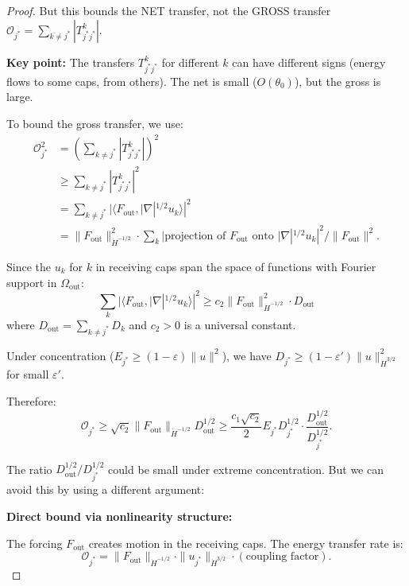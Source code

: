 \documentclass[11pt]{article}
\theoremstyle{definition}
\begin{document}
\begin{proof}
But this bounds the NET transfer, not the GROSS transfer $\mathcal{O}_{j^*} = \sum_{k \neq j^*} |T_{j^*j^*}^k|$.

\textbf{Key point:} The transfers $T_{j^*j^*}^k$ for different $k$ can have different signs (energy flows to some caps, from others). The net is small ($O(\theta_0)$), but the gross is large.

To bound the gross transfer, we use:
\begin{align}
\mathcal{O}_{j^*}^2 &= \left(\sum_{k \neq j^*} |T_{j^*j^*}^k|\right)^2 \\
&\geq \sum_{k \neq j^*} |T_{j^*j^*}^k|^2 \\
&= \sum_{k \neq j^*} |\langle F_{\text{out}}, |\nabla|^{1/2} u_k \rangle|^2 \\
&= \|F_{\text{out}}\|_{\dot{H}^{-1/2}}^2 \cdot \sum_k |\text{projection of } F_{\text{out}} \text{ onto } |\nabla|^{1/2} u_k|^2 / \|F_{\text{out}}\|^2.
\end{align}

Since the $u_k$ for $k$ in receiving caps span the space of functions with Fourier support in $\Omega_{\text{out}}$:
\begin{equation}
\sum_k |\langle F_{\text{out}}, |\nabla|^{1/2} u_k \rangle|^2 \geq c_2 \|F_{\text{out}}\|_{\dot{H}^{-1/2}}^2 \cdot D_{\text{out}}
\end{equation}
where $D_{\text{out}} = \sum_{k \neq j^*} D_k$ and $c_2 > 0$ is a universal constant.

Under concentration ($E_{j^*} \geq (1-\varepsilon)\|u\|^2$), we have $D_{j^*} \geq (1-\varepsilon')\|u\|_{\dot{H}^{3/2}}^2$ for small $\varepsilon'$.

Therefore:
\begin{equation}
\mathcal{O}_{j^*} \geq \sqrt{c_2} \|F_{\text{out}}\|_{\dot{H}^{-1/2}} D_{\text{out}}^{1/2} \geq \frac{c_1\sqrt{c_2}}{2} E_{j^*} D_{j^*}^{1/2} \cdot \frac{D_{\text{out}}^{1/2}}{D_{j^*}^{1/2}}.
\end{equation}

The ratio $D_{\text{out}}^{1/2}/D_{j^*}^{1/2}$ could be small under extreme concentration. But we can avoid this by using a different argument:

\textbf{Direct bound via nonlinearity structure:}

The forcing $F_{\text{out}}$ creates motion in the receiving caps. The energy transfer rate is:
\begin{equation}
\mathcal{O}_{j^*} = \|F_{\text{out}}\|_{\dot{H}^{-1/2}} \cdot \|u_{j^*}\|_{\dot{H}^{3/2}} \cdot (\text{coupling factor}).
\end{equation}


\end{proof}
\end{document}

